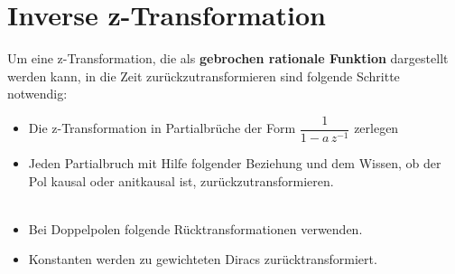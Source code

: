 \section{Inverse z-Transformation}
	Um eine z-Transformation, die als \textbf{gebrochen rationale Funktion} dargestellt werden kann, in die Zeit zurückzutransformieren sind folgende Schritte notwendig:
	\begin{itemize}
	 \item Die z-Transformation in Partialbrüche der Form $\dfrac{1}{1-a\,z^{-1}}$ zerlegen
	 \item Jeden Partialbruch mit Hilfe folgender Beziehung und dem Wissen, ob der Pol kausal oder anitkausal ist, zurückzutransformieren.\\[0.2cm]
	$\quad$
	\item Bei Doppelpolen folgende Rücktransformationen verwenden.\\[0.2cm]
	 \item Konstanten werden zu gewichteten Diracs zurücktransformiert.$\qquad$ 
	\end{itemize}
	
